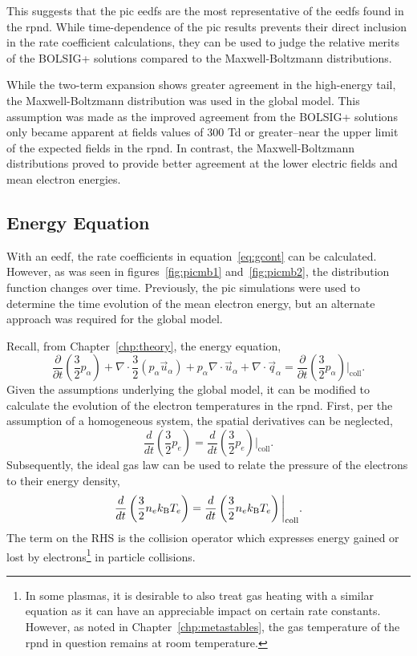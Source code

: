 This suggests that the \acs{pic} \acs{eedf}s are the most representative of the
\acs{eedf}s found in the \acs{rpnd}. While time-dependence of the \acs{pic}
results prevents their direct inclusion in the rate coefficient calculations,
they can be used to judge the relative merits of the BOLSIG+ solutions compared
to the Maxwell-Boltzmann distributions.

While the two-term expansion shows greater agreement in the high-energy tail,
the Maxwell-Boltzmann distribution was used in the global model. This assumption
was made as the improved agreement from the BOLSIG+ solutions only became
apparent at fields values of 300 Td or greater--near the upper limit of the
expected fields in the \acs{rpnd}. In contrast, the Maxwell-Boltzmann
distributions proved to provide better agreement at the lower electric fields
and mean electron energies.

\subsection{Energy Equation}

With an \acs{eedf}, the rate coefficients in equation~\ref{eq:gcont} can be
calculated. However, as was seen in figures~\ref{fig:picmb1}
and~\ref{fig:picmb2}, the distribution function changes over time. Previously,
the \acs{pic} simulations were used to determine the time evolution of the mean
electron energy, but an alternate approach was required for the global model.

Recall, from Chapter~\ref{chp:theory}, the energy equation,
\begin{equation}
  \frac{\partial}{\partial t}\left(\frac{3}{2}p_\alpha\right) 
  + \nabla\cdot\frac{3}{2} (p_\alpha\vec{u}_\alpha)
  + p_\alpha\nabla\cdot\vec{u}_\alpha
  + \nabla\cdot\vec{q}_\alpha
  = \frac{\partial}{\partial
  t}\left(\frac{3}{2}p_\alpha\right)\bigg|_\mathrm{coll}.
\end{equation}
Given the assumptions underlying the global model, it can be modified to
calculate the evolution of the electron temperatures in the \acs{rpnd}. First,
per the assumption of a homogeneous system, the spatial derivatives can be
neglected,
\begin{equation}
  \frac{d}{dt}\left(\frac{3}{2}p_e\right) =
  \frac{d}{dt}\left(\frac{3}{2}p_e\right)\bigg|_\mathrm{coll}.
\end{equation}
Subsequently, the ideal gas law can be used to relate the pressure of the
electrons to their energy density,
\begin{equation}
  \frac{d}{dt}\left(\frac{3}{2}n_ek_\mathrm{B} T_e \right) =
  \frac{d}{dt}\left(\frac{3}{2}n_ek_\mathrm{B} T_e \right)\bigg|_\mathrm{coll}.
  \label{eq:energy2}
\end{equation}
The term on the RHS is the collision operator which expresses energy gained or
lost by electrons\footnote{In some plasmas, it is desirable to also treat gas
heating with a similar equation as it can have an appreciable impact on certain
rate constants. However, as noted in Chapter~\ref{chp:metastables}, the gas
temperature of the \acs{rpnd} in question remains at room temperature.} in
particle collisions.

